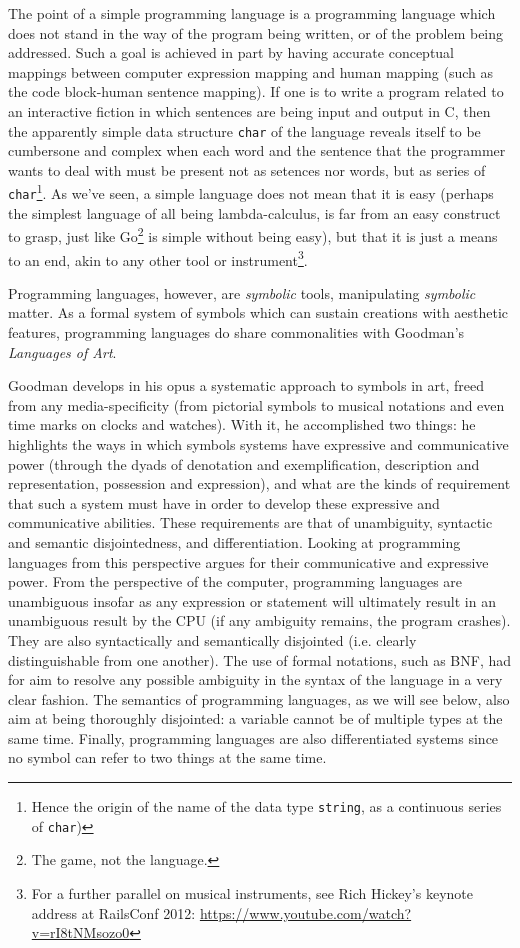 The point of a simple programming language is a programming language which does not stand in the way of the program being written, or of the problem being addressed. Such a goal is achieved in part by having accurate conceptual mappings between computer expression mapping and human mapping (such as the code block-human sentence mapping\citep{fedorenko_language_2019}). If one is to write a program related to an interactive fiction in which sentences are being input and output in C, then the apparently simple data structure \lstinline{char} of the language reveals itself to be cumbersone and complex when each word and the sentence that the programmer wants to deal with must be present not as setences nor words, but as series of \lstinline{char}\footnote{Hence the origin of the name of the data type \lstinline{string}, as a continuous series of \lstinline{char})}. As we've seen, a simple language does not mean that it is easy (perhaps the simplest language of all being lambda-calculus, is far from an easy construct to grasp, just like Go\footnote{The game, not the language.} is simple without being easy), but that it is just a means to an end, akin to any other tool or instrument\footnote{For a further parallel on musical instruments, see Rich Hickey's keynote address at RailsConf 2012: \url{https://www.youtube.com/watch?v=rI8tNMsozo0}}.

Programming languages, however, are \emph{symbolic} tools, manipulating \emph{symbolic} matter. As a formal system of symbols which can sustain creations with aesthetic features, programming languages do share commonalities with Goodman's \emph{Languages of Art}.

Goodman develops in his opus a systematic approach to symbols in art, freed from any media-specificity (from pictorial symbols to musical notations and even time marks on clocks and watches). With it, he accomplished two things: he highlights the ways in which symbols systems have expressive and communicative power (through the dyads of denotation and exemplification, description and representation, possession and expression), and what are the kinds of requirement that such a system must have in order to develop these expressive and communicative abilities. These requirements are that of unambiguity, syntactic and semantic disjointedness, and differentiation\citep{goodman_languages_1976}. Looking at programming languages from this perspective argues for their communicative and expressive power. From the perspective of the computer, programming languages are unambiguous insofar as any expression or statement will ultimately result in an unambiguous result by the CPU (if any ambiguity remains, the program crashes). They are also syntactically and semantically disjointed (i.e. clearly distinguishable from one another). The use of formal notations, such as BNF, had for aim to resolve any possible ambiguity in the syntax of the language in a very clear fashion. The semantics of programming languages, as we will see below, also aim at being thoroughly disjointed: a variable cannot be of multiple types at the same time. Finally, programming languages are also differentiated systems since no symbol can refer to two things at the same time.

